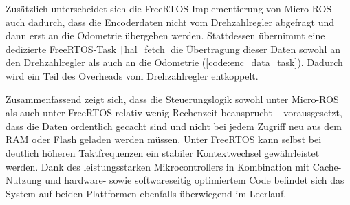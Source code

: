 Zusätzlich unterscheidet sich die FreeRTOS-Implementierung von Micro-ROS auch
dadurch, dass die Encoderdaten nicht vom Drehzahlregler abgefragt und dann erst
an die Odometrie übergeben werden. Stattdessen übernimmt eine dedizierte
FreeRTOS-Task \texttt|hal_fetch| die Übertragung dieser Daten sowohl an
den Drehzahlregler als auch an die Odometrie (\ref{code:enc_data_task}). Dadurch
wird ein Teil des Overheads vom Drehzahlregler entkoppelt.

Zusammenfassend zeigt sich, dass die Steuerungslogik sowohl unter Micro-ROS als
auch unter FreeRTOS relativ wenig Rechenzeit beansprucht -- vorausgesetzt, dass
die Daten ordentlich gecacht sind und nicht bei jedem Zugriff neu aus dem RAM
oder Flash geladen werden müssen. Unter FreeRTOS kann selbst bei deutlich
höheren Taktfrequenzen ein stabiler Kontextwechsel gewährleistet werden. Dank
des leistungsstarken Mikrocontrollers in Kombination mit Cache-Nutzung und
hardware- sowie softwareseitig optimiertem Code befindet sich das System auf
beiden Plattformen ebenfalls überwiegend im Leerlauf.
